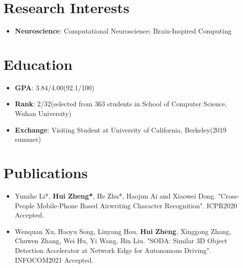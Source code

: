 \documentclass{resume}
\begin{document}
    

\section{{\bfseries Research Interests}}
\begin{itemize}[parsep=0.2ex]
\item \textbf{Neuroscience}: Computational Neuroscience; Brain-Inspired Computing
\end{itemize}

\section{{\bfseries Education}}
\begin{itemize}[parsep=0.1ex]
    \item \textbf{GPA}: 3.84/4.00(92.1/100)
    \item \textbf{Rank}: 2/32(selected from 363 students in School of Computer Science, Wuhan University)
    \item \textbf{Exchange}: Visiting Student at University of California, Berkeley(2019 summer)
\end{itemize}

\section{{\bfseries Publications}}
\begin{itemize}[parsep=0.2ex]
    \item Yunzhe Li*, \textbf{Hui Zheng*}, He Zhu*, Haojun Ai and Xiaowei Dong. "Cross-People Mobile-Phone Based Airwriting Character Recognition". ICPR2020 Accepted.
    \item Wenquan Xu, Haoyu Song, Linyang Hou, \textbf{Hui Zheng}, Xinggong Zhang, Chuwen Zhang, Wei Hu, Yi Wang, Bin Liu. "SODA: Similar 3D Object Detection Accelerator at Network Edge for Autonomous Driving". INFOCOM2021 Accepted.
\end{itemize}

\end{document}
